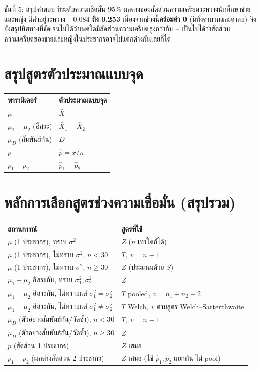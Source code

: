 \documentclass[10pt]{extarticle}
\begin{document}
\begin{stepbox}{ขั้นที่ 5: สรุปคำตอบ}
ที่ระดับความเชื่อมั่น 95\% ผลต่างของสัดส่วนความเครียดระหว่างนักศึกษาชายและหญิง มีค่าอยู่ระหว่าง \textbf{$-0.084$ ถึง 0.253} เนื่องจากช่วงนี้\textbf{คร่อมค่า 0} (มีทั้งค่าบวกและค่าลบ) จึงยังสรุปทิศทางที่ชัดเจนไม่ได้ว่าเพศใดมีสัดส่วนความเครียดสูงกว่ากัน -- เป็นไปได้ว่าสัดส่วนความเครียดของชายและหญิงในประชากรอาจไม่แตกต่างกันเลยก็ได้
\end{stepbox}

\section{สรุปสูตรตัวประมาณแบบจุด}
\begin{formulabox}
\begin{tabular}{@{}ll@{}}
\textbf{พารามิเตอร์} & \textbf{ตัวประมาณแบบจุด}\\\hline
$\mu$ & $\bar X$\\
$\mu_1-\mu_2$ (อิสระ) & $\bar X_1-\bar X_2$\\
$\mu_D$ (สัมพันธ์กัน) & $\bar D$\\
$p$ & $\hat p=x/n$\\
$p_1-p_2$ & $\hat p_1-\hat p_2$\\
\end{tabular}
\end{formulabox}

\section{หลักการเลือกสูตรช่วงความเชื่อมั่น (สรุปรวม)}
\begin{center}\small
\begin{tabular}{@{}p{6.7cm}p{6.3cm}@{}}
\toprule
\textbf{สถานการณ์} & \textbf{สูตรที่ใช้}\\\midrule
$\mu$ (1 ประชากร), ทราบ $\sigma^2$ & $Z$ ($n$ เท่าใดก็ได้)\\
$\mu$ (1 ประชากร), ไม่ทราบ $\sigma^2$, $n<30$ & $T,\ v=n-1$\\
$\mu$ (1 ประชากร), ไม่ทราบ $\sigma^2$, $n\ge30$ & $Z$ (ประมาณด้วย $S$)\\
$\mu_1-\mu_2$ อิสระกัน, ทราบ $\sigma_1^2,\sigma_2^2$ & $Z$\\
$\mu_1-\mu_2$ อิสระกัน, ไม่ทราบแต่ $\sigma_1^2=\sigma_2^2$ & $T$ pooled, $v=n_1+n_2-2$\\
$\mu_1-\mu_2$ อิสระกัน, ไม่ทราบแต่ $\sigma_1^2\ne\sigma_2^2$ & $T$ Welch, $v$ ตามสูตร Welch--Satterthwaite\\
$\mu_D$ (ตัวอย่างสัมพันธ์กัน/วัดซ้ำ), $n<30$ & $T,\ v=n-1$\\
$\mu_D$ (ตัวอย่างสัมพันธ์กัน/วัดซ้ำ), $n\ge30$ & $Z$\\
$p$ (สัดส่วน 1 ประชากร) & $Z$ เสมอ\\
$p_1-p_2$ (ผลต่างสัดส่วน 2 ประชากร) & $Z$ เสมอ (ใช้ $\hat p_1,\hat p_2$ แยกกัน ไม่ pool)\\
\bottomrule
\end{tabular}
\end{center}
\end{document}
